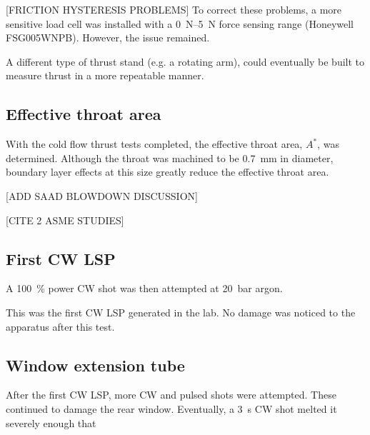 
            [FRICTION HYSTERESIS PROBLEMS] To correct these problems, a more sensitive load cell was installed with a \qtyrange{0}{5}{N} force sensing range (Honeywell FSG005WNPB). However, the issue remained.

            A different type of thrust stand (e.g. a rotating arm), could eventually be built to measure thrust in a more repeatable manner.
        
        \subsection{Effective throat area}
            
            With the cold flow thrust tests completed, the effective throat area, $A^*$, was determined. Although the throat was machined to be \qty{0.7}{mm} in diameter, boundary layer effects at this size greatly reduce the effective throat area.

            [ADD SAAD BLOWDOWN DISCUSSION]

            [CITE 2 ASME STUDIES]


        \subsection{First CW LSP}
            
            A \qty{100}{\%} power CW shot was then attempted at \qty{20}{bar} argon. 


            This was the first CW LSP generated in the lab. No damage was noticed to the apparatus after this test.

        \subsection{Window extension tube}
            
            After the first CW LSP, more CW and pulsed shots were attempted. These continued to damage the rear window. Eventually, a \qty{3}{s} CW shot melted it severely enough that 

